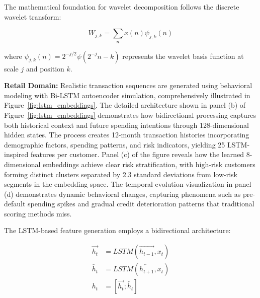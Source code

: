 \documentclass[a4paper,11pt,twoside]{article}
\newcommand{\0}{\Bf{0}}
\theoremstyle{definition}
\begin{document}
The mathematical foundation for wavelet decomposition follows the discrete wavelet transform:

\begin{equation}
W_{j,k} = \sum_{n} x(n) \psi_{j,k}(n)
\end{equation}

where $\psi_{j,k}(n) = 2^{-j/2} \psi(2^{-j}n - k)$ represents the wavelet basis function at scale $j$ and position $k$.

\textbf{Retail Domain:} Realistic transaction sequences are generated using behavioral modeling with Bi-LSTM autoencoder simulation, comprehensively illustrated in Figure~\ref{fig:lstm_embeddings}. The detailed architecture shown in panel (b) of Figure~\ref{fig:lstm_embeddings} demonstrates how bidirectional processing captures both historical context and future spending intentions through 128-dimensional hidden states. The process creates 12-month transaction histories incorporating demographic factors, spending patterns, and risk indicators, yielding 25 LSTM-inspired features per customer. Panel (c) of the figure reveals how the learned 8-dimensional embeddings achieve clear risk stratification, with high-risk customers forming distinct clusters separated by 2.3 standard deviations from low-risk segments in the embedding space. The temporal evolution visualization in panel (d) demonstrates dynamic behavioral changes, capturing phenomena such as pre-default spending spikes and gradual credit deterioration patterns that traditional scoring methods miss.

The LSTM-based feature generation employs a bidirectional architecture:

\begin{align}
\overrightarrow{h_t} &= LSTM(\overrightarrow{h_{t-1}}, x_t) \\
\overleftarrow{h_t} &= LSTM(\overleftarrow{h_{t+1}}, x_t) \\
h_t &= [\overrightarrow{h_t}; \overleftarrow{h_t}]
\end{align}
\end{document}
